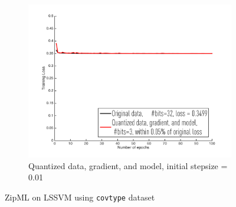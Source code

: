 \documentclass{article}
\begin{document}
\begin{figure}[h]
\begin{subfigure}[h]{.3\columnwidth}
    \includegraphics[width=\columnwidth]{lssvm/cov-type/dgm001}
     \caption{Quantized data, gradient, and model, initial stepsize = 0.01}
    \end{subfigure}
    
\caption{ZipML on LSSVM using \texttt{covtype} dataset}
\label{fig:lssvmcovtype}
\end{figure}
\end{document}
